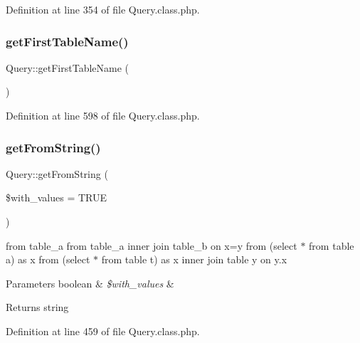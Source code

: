 Definition at line 354 of file Query.\+class.\+php.

\hypertarget{classQuery_a440208634d58f7dbbf6c5220133b21c0}{}\label{classQuery_a440208634d58f7dbbf6c5220133b21c0} 
\subsubsection{\texorpdfstring{get\+First\+Table\+Name()}{getFirstTableName()}}
{\footnotesize\ttfamily Query\+::get\+First\+Table\+Name (\begin{DoxyParamCaption}{ }\end{DoxyParamCaption})}



Definition at line 598 of file Query.\+class.\+php.

\hypertarget{classQuery_a804cc37929736e0fea414721b90af410}{}\label{classQuery_a804cc37929736e0fea414721b90af410} 
\subsubsection{\texorpdfstring{get\+From\+String()}{getFromString()}}
{\footnotesize\ttfamily Query\+::get\+From\+String (\begin{DoxyParamCaption}\item[{}]{\$with\+\_\+values = {\ttfamily TRUE} }\end{DoxyParamCaption})}

from table\+\_\+a from table\+\_\+a inner join table\+\_\+b on x=y from (select $\ast$ from table a) as x from (select $\ast$ from table t) as x inner join table y on y.\+x 
\begin{DoxyParams}[1]{Parameters}
boolean & {\em \$with\+\_\+values} & \\
\hline
\end{DoxyParams}
\begin{DoxyReturn}{Returns}
string 
\end{DoxyReturn}


Definition at line 459 of file Query.\+class.\+php.

\hypertarget{classQuery_ab5a30b706a9e963bf638409a567ff8d9}{}\label{classQuery_ab5a30b706a9e963bf638409a567ff8d9} 
